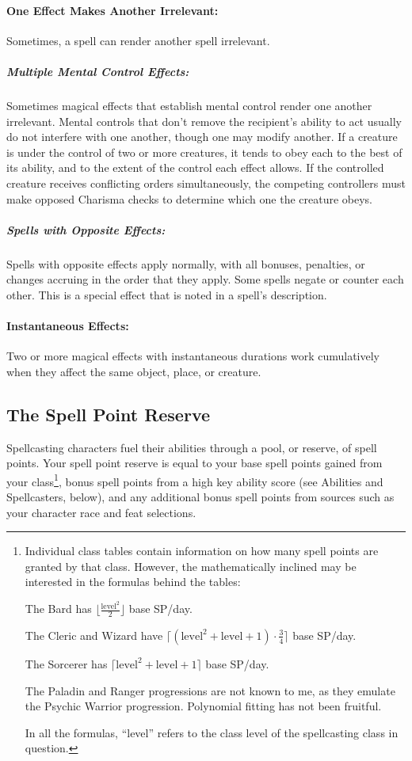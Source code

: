 \paragraph{One Effect Makes Another Irrelevant:} Sometimes, a spell can render another spell irrelevant.

\subparagraph{Multiple Mental Control Effects:} Sometimes magical effects that establish mental control render one another irrelevant. 
Mental controls that don't remove the recipient's ability to act usually do not interfere with one another, though one may modify another. If a creature is under the control of two or more creatures, it tends to obey each to the best of its ability, and to the extent of the control each effect allows. 
If the controlled creature receives conflicting orders simultaneously, the competing controllers must make opposed Charisma checks to determine which one the creature obeys.

\subparagraph{Spells with Opposite Effects:} Spells with opposite effects apply normally, with all bonuses, penalties, or changes accruing in the order that they apply.
Some spells negate or counter each other. This is a special effect that is noted in a spell's description.

\paragraph{Instantaneous Effects:} Two or more magical effects with instantaneous durations work cumulatively when they affect the same object, place, or creature.

\subsection{The Spell Point Reserve}
Spellcasting characters fuel their abilities through a pool, or reserve, of spell points. 
Your spell point reserve is equal to your base spell points gained from your class\footnote{
Individual class tables contain information on how many spell points are granted by that class. However, the mathematically inclined may be interested in the formulas behind the tables:
\begin{list}{}{\leftmargin=1em}
 \item The Bard has $\lfloor\frac{\text{level}^2}{2}\rfloor$ base SP/day.
 \item The Cleric and Wizard have $\lceil (\text{level}^2+\text{level}+1) \cdot \frac{3}{4}\rceil$ base SP/day.
 \item The Sorcerer has $\lceil \text{level}^2+\text{level}+1 \rceil$ base SP/day.
 \item The Paladin and Ranger progressions are not known to me, as they emulate the Psychic Warrior progression. Polynomial fitting has not been fruitful.
\end{list}
In all the formulas, ``level'' refers to the class level of the spellcasting class in question.}, bonus spell points from a high key ability score (see Abilities and Spellcasters, below), and any additional bonus spell points from sources such as your character race and feat selections.
